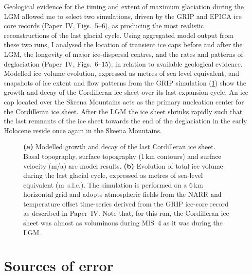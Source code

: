 \documentclass{article}
\newcommand{\CCYC}[0]{Paper~IV}     %
\begin{document}
Geological evidence for the timing and extent of maximum glaciation during the
LGM allowed me to select two simulations, driven by the GRIP
\citep{Dansgaard.etal.1993} and EPICA \citep{Jouzel.etal.2007} ice core records
(\CCYC, Figs.~5--6), as producing the most realistic reconstructions of the
last glacial cycle. Using aggregated model output from these two runs, I
analysed the location of transient ice caps before and after the LGM, the
longevity of major ice-dispersal centres, and the rates and patterns of
deglaciation (\CCYC, Figs.~6--15), in relation to available geological
evidence. Modelled ice volume evolution, expressed as metres of sea level
equivalent, and snapshots of ice extent and flow patterns from the GRIP
simulation (\cref{fig:plot-snapshots}) show the growth and decay of the
Cordilleran ice sheet over its last expansion cycle. An ice cap located over
the Skeena Mountains acts as the primary nucleation center for the Cordilleran
ice sheet. After the LGM the ice sheet shrinks rapidly such that the last
remnants of the ice sheet towards the end of the deglaciation in the early
Holocene reside once again in the Skeena Mountains.

\begin{figure}
  \centering
  \caption{\textbf{(a)} Modelled growth and decay of the last Cordilleran ice
           sheet. Basal topography, surface topography (1\,km contours) and
           surface velocity (m/a) are model results.
           \textbf{(b)} Evolution of total ice volume during the last glacial
           cycle, expressed as metres of sea-level equivalent (m~s.l.e.). The
           simulation is performed on a 6\,km horizontal grid and adopts
           atmospheric fields from the NARR \citep{Mesinger.etal.2006} and
           temperature offset time-series derived from the GRIP ice-core record
           \citep{Dansgaard.etal.1993} as described in \CCYC. Note that, for
           this run, the Cordilleran ice sheet was almost as voluminous during
           MIS~4 as it was during the LGM.}
  \label{fig:plot-snapshots}
\end{figure}


\section{Sources of error}
\end{document}
